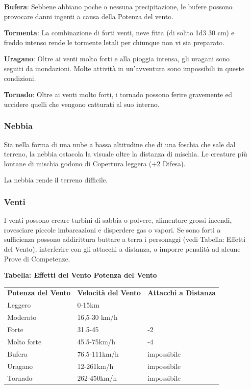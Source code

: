 \documentclass[a4paper,11pt,twoside,openany]{book}
\begin{document}
\textbf{Bufera}: Sebbene abbiano poche o nessuna precipitazione, le bufere possono provocare danni ingenti a causa della Potenza del vento.

\textbf{Tormenta}: La combinazione di forti venti, neve fitta (di solito 1d3 \texttimes{} 30 cm) e freddo intenso rende le tormente letali per chiunque non vi sia preparato.

\textbf{Uragano}: Oltre ai venti molto forti e alla pioggia intensa, gli uragani sono seguiti da inondazioni. Molte attività in un'avventura sono impossibili in queste condizioni.

\textbf{Tornado}: Oltre ai venti molto forti, i tornado possono ferire gravemente ed uccidere quelli che vengono catturati al suo interno.

\subsubsection{Nebbia}

\label{nebbia}

Sia nella forma di una nube a bassa altitudine che di una foschia che sale dal terreno, la nebbia ostacola la visuale oltre la distanza di mischia. Le creature più lontane di mischia godono di Copertura leggera (+2 Difesa).

La nebbia rende il terreno difficile.


\subsubsection{Venti}

\label{venti}

I venti possono creare turbini di sabbia o polvere, alimentare grossi incendi, rovesciare piccole imbarcazioni e disperdere gas o vapori. Se sono forti a sufficienza possono addirittura buttare a terra i personaggi (vedi Tabella: Effetti del Vento), interferire con gli attacchi a distanza, o imporre penalità ad alcune Prove di Competenze.

\textbf{Tabella: Effetti del Vento Potenza del Vento}

\medskip

\begin{tabular}{lll}
	\toprule
	\textbf{Potenza del Vento} & \textbf{Velocità del Vento}   & \textbf{Attacchi a Distanza} \\
	Leggero     & 0-15km \\
	Moderato    & 16,5-30 km/h  \\
	Forte       & 31.5-45        & -2 \\
	Molto forte & 45.5-75km/h    & -4 \\
	Bufera      & 76.5-111km/h   & impossibile  \\
	Uragano     & 12-261km/h     & impossibile \\
	Tornado     & 262-450km/h    & impossibile\\
\end{tabular}
\end{document}
